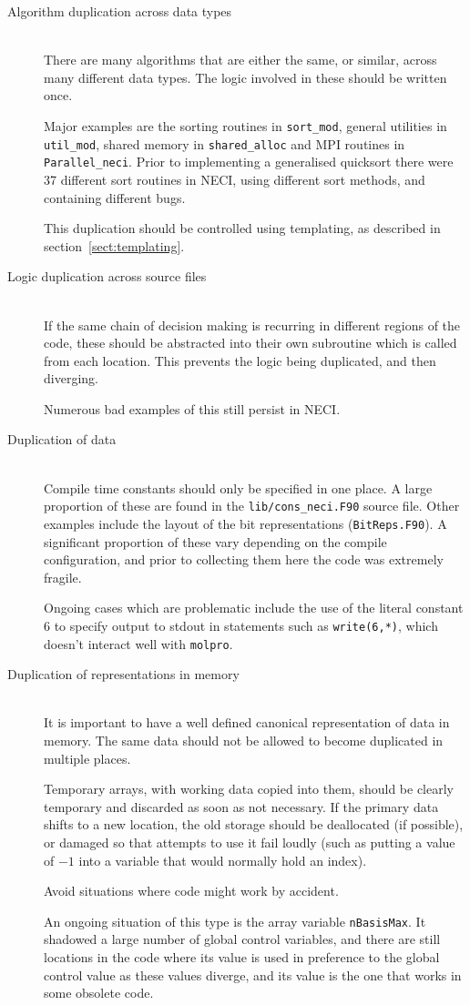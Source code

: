 \documentclass[a4paper,notitlepage]{scrreprt}
\newcommand\headitem[1]{\needspace{1.5\baselineskip}\item[{\boldmath #1 \nopagebreak}] \hfill \\ \nopagebreak}
\let\code\lstinline
\begin{document}
	\begin{description}
		\headitem{Algorithm duplication across data types}
			There are many algorithms that are either the same, or similar,
			across many different data types. The logic involved in these
			should be written once.

			Major examples are the sorting routines in \code{sort_mod},
			general utilities in \code{util_mod}, shared memory in
			\code{shared_alloc} and MPI routines in
			\code{Parallel_neci}. Prior to implementing a generalised
			quicksort there were 37 different sort routines in NECI, using
			different sort methods, and containing different bugs.

			This duplication should be controlled using templating, as
			described in section~\ref{sect:templating}.

		\headitem{Logic duplication across source files}
			If the same chain of decision making is recurring in different
			regions of the code, these should be abstracted into their own
			subroutine which is called from each location. This prevents the
			logic being duplicated, and then diverging.

			Numerous bad examples of this still persist in NECI.

		\headitem{Duplication of data}
			Compile time constants should only be specified in one place. A
			large proportion of these are found in the
			\code{lib/cons_neci.F90} source file. Other examples include
			the layout of the bit representations (\code{BitReps.F90}).
			A significant proportion of these vary depending on the compile
			configuration, and prior to collecting them here the code was
			extremely fragile.

			Ongoing cases which are problematic include the use of the literal
			constant $6$ to specify output to stdout in statements such as
			\code{write(6,*)}, which doesn't interact well with
			\code{molpro}.

		\headitem{Duplication of representations in memory}
			It is important to have a well defined canonical representation of
			data in memory. The same data should not be allowed to become
			duplicated in multiple places.

			Temporary arrays, with working data copied into them, should be
			clearly temporary and discarded as soon as not necessary. If the
			primary data shifts to a new location, the old storage should be
			deallocated (if possible), or damaged so that attempts to use it
			fail loudly (such as putting a value of $-1$ into a variable that
			would normally hold an index).

			Avoid situations where code might work by accident.

			An ongoing situation of this type is the array variable
			\code{nBasisMax}. It shadowed a large number of global control
			variables, and there are still locations in the code where its
			value is used in preference to the global control value as these
			values diverge, and its value is the one that works in some
			obsolete code.
	\end{description}
\end{document}
